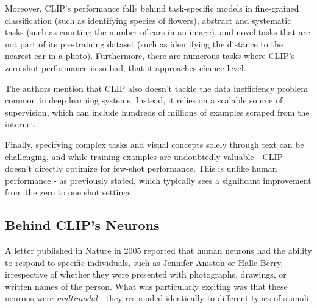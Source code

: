 \documentclass{article}
\begin{document}
\medskip
\noindent
Moreover, CLIP's performance falls behind task-specific models in fine-grained classification (such as identifying species of flowers), abstract and systematic tasks (such as counting the number of cars in an image), and novel tasks that are not part of its pre-training dataset (such as identifying the distance to the nearest car in a photo). Furthermore, there are numerous tasks where CLIP's zero-shot performance is so bad, that it approaches chance level. 

\medskip
\noindent
The authors mention that CLIP also doesn't tackle the data inefficiency problem common in deep learning systems. Instead, it relies on a scalable source of supervision, which can include hundreds of millions of examples scraped from the internet.

\medskip
\noindent
Finally, specifying complex tasks and visual concepts solely through text can be challenging, and while training examples are undoubtedly valuable - CLIP doesn't directly optimize for few-shot performance. This is unlike human performance - as previously stated, which typically sees a significant improvement from the zero to one shot settings.




\subsection{Behind CLIP's Neurons}
\label{subsec:clip-multimodal}

A letter published in Nature in 2005 reported that human neurons had the ability to respond to specific individuals, such as Jennifer Aniston or Halle Berry, irrespective of whether they were presented with photographs, drawings, or written names of the person. What was particularly exciting was that these neurons were \emph{multimodal} - they responded identically to different types of stimuli.
\end{document}

